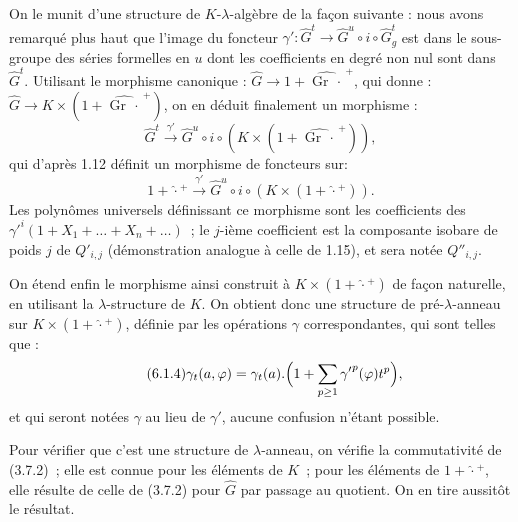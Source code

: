 On le
munit d'une structure de \(K\)-\(\lambda\)-algèbre de la façon suivante : nous avons remarqué plus haut que l'image du foncteur \(\gamma'\colon\widehat G^t\longrightarrow\widehat G^u\circ i\circ\widehat G^t_g\) est dans le sous-groupe des séries formelles en \(u\) dont les coefficients en degré non nul sont dans \(\widehat G^t\). Utilisant le morphisme canonique : \(\widehat G\longrightarrow 1+\widehat{\operatorname{Gr}\,\cdot\,}^{+}\), qui donne : \(\widehat G\longrightarrow K\times(1+\widehat{\operatorname{Gr}\,\cdot\,}^{+})\), on en déduit finalement un morphisme :
\[
  \widehat G^t\xrightarrow{\gamma'}\widehat G^u\circ i\circ(K\times(1+\widehat{\operatorname{Gr}\,\cdot\,}^{+})),
\]
qui d'après 1.12 définit un morphisme de foncteurs sur\qquad:
\[
  1+\widehat{\cdot}{}^{+}\xrightarrow{\gamma'}\widehat G^u\circ i\circ(K\times(1+\widehat{\cdot}{}^{+})).
\]
Les polynômes universels définissant ce morphisme sont les coefficients des \({\gamma'}^{i}(1+X_1+\dots+X_n+\dots)\)~; le \(j\)-ième coefficient est la composante isobare de poids \(j\) de \(Q'_{i,j}\) (démonstration analogue à celle de 1.15), et sera notée \(Q''_{i,j}\).

On étend enfin le morphisme ainsi construit à \(K\times(1+\widehat{\cdot}{}^{+})\) de façon naturelle, en utilisant la \(\lambda\)-structure de \(K\). On obtient donc une structure de pré-\(\lambda\)-anneau sur \(K\times(1+\widehat{\cdot}{}^{+})\), définie par les opérations \(\gamma\) correspondantes, qui sont telles que :
\begin{equation}\tag{6.1.4}
  \gamma_t(a,\varphi)=\gamma_t(a).\Bigl(1+\sum_{p\ge1}{\gamma'}^{p}(\varphi)t^{p}\Bigr),
\end{equation}
et qui seront notées \(\gamma\) au lieu de \(\gamma'\), aucune confusion n'étant possible.

Pour vérifier que c'est une structure de \(\lambda\)-anneau, on vérifie la commutativité de (3.7.2)~; elle est connue pour les éléments de \(K\)~; pour les éléments de \(1+\widehat{\cdot}{}^{+}\), elle résulte de celle de (3.7.2) pour \(\widehat G\) par passage au quotient. On en tire aussitôt le résultat.



\providecommand{\Ghat}{\widehat G}
\providecommand{\Aqhat}{\widehat A_{\mathbb Q}}
\providecommand{\Ch}{\operatorname{Ch}}
\providecommand{\Log}{\operatorname{Log}}
\renewcommand{\id}{\operatorname{id}}
\providecommand{\gr}{\operatorname{gr}}
\providecommand{\Hom}{\operatorname{Hom}}
\providecommand{\epsi}{\varepsilon}
\providecommand{\clgr}{\operatorname{cl}}
\providecommand{\Fil}{\operatorname{Fil}}
\providecommand{\Gr}{\operatorname{Gr}}
\providecommand{\Sym}{\operatorname{Sym}}


